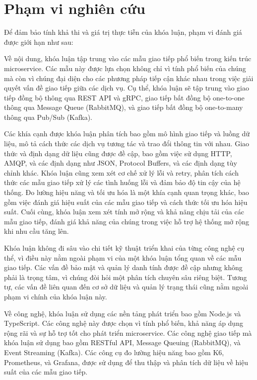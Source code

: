 \section{Phạm vi nghiên cứu}
Để đảm bảo tính khả thi và giá trị thực tiễn của khóa luận, phạm vi đánh giá được giới hạn như sau:

Về nội dung, khóa luận tập trung vào các mẫu giao tiếp phổ biến trong kiến trúc microservice. Các mẫu này được lựa chọn không chỉ vì tính phổ biến của chúng mà còn vì chúng đại diện cho các phương pháp tiếp cận khác nhau trong việc giải quyết vấn đề giao tiếp giữa các dịch vụ. Cụ thể, khóa luận sẽ tập trung vào giao tiếp đồng bộ thông qua REST API và gRPC, giao tiếp bất đồng bộ one-to-one thông qua Message Queue (RabbitMQ), và giao tiếp bất đồng bộ one-to-many thông qua Pub/Sub (Kafka).

Các khía cạnh được khóa luận phân tích bao gồm mô hình giao tiếp và luồng dữ liệu, mô tả cách thức các dịch vụ tương tác và trao đổi thông tin với nhau. Giao thức và định dạng dữ liệu cũng được đề cập, bao gồm việc sử dụng HTTP, AMQP, và các định dạng như JSON, Protocol Buffers, và các định dạng tùy chỉnh khác. Khóa luận cũng xem xét cơ chế xử lý lỗi và retry, phân tích cách thức các mẫu giao tiếp xử lý các tình huống lỗi và đảm bảo độ tin cậy của hệ thống. Đo lường hiệu năng và tối ưu hóa là một khía cạnh quan trọng khác, bao gồm việc đánh giá hiệu suất của các mẫu giao tiếp và cách thức tối ưu hóa hiệu suất. Cuối cùng, khóa luận xem xét tính mở rộng và khả năng chịu tải của các mẫu giao tiếp, đánh giá khả năng của chúng trong việc hỗ trợ hệ thống mở rộng khi nhu cầu tăng lên.

Khóa luận không đi sâu vào chi tiết kỹ thuật triển khai của từng công nghệ cụ thể, vì điều này nằm ngoài phạm vi của một khóa luận tổng quan về các mẫu giao tiếp. Các vấn đề bảo mật và quản lý danh tính được đề cập nhưng không phải là trọng tâm, vì chúng đòi hỏi một phân tích chuyên sâu riêng biệt. Tương tự, các vấn đề liên quan đến cơ sở dữ liệu và quản lý trạng thái cũng nằm ngoài phạm vi chính của khóa luận này.

Về công nghệ, khóa luận sử dụng các nền tảng phát triển bao gồm Node.js và TypeScript. Các công nghệ này được chọn vì tính phổ biến, khả năng áp dụng rộng rãi và sự hỗ trợ tốt cho phát triển microservice. Các công nghệ giao tiếp mà khóa luận sử dụng bao gồm RESTful API, Message Queuing (RabbitMQ), và Event Streaming (Kafka). Các công cụ đo lường hiệu năng bao gồm K6, Prometheus, và Grafana, được sử dụng để thu thập và phân tích dữ liệu về hiệu suất của các mẫu giao tiếp.

